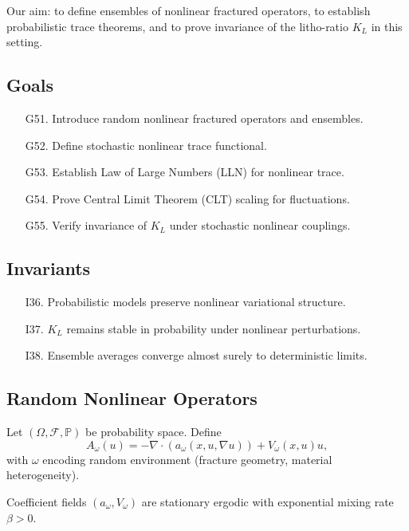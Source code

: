 Our aim: to define ensembles of nonlinear fractured operators, to establish probabilistic trace theorems, and to prove invariance of the litho-ratio $K_L$ in this setting.

\subsection*{Goals}

\begin{itemize}
  \item[G51.] Introduce random nonlinear fractured operators and ensembles.  
  \item[G52.] Define stochastic nonlinear trace functional.  
  \item[G53.] Establish Law of Large Numbers (LLN) for nonlinear trace.  
  \item[G54.] Prove Central Limit Theorem (CLT) scaling for fluctuations.  
  \item[G55.] Verify invariance of $K_L$ under stochastic nonlinear couplings.  
\end{itemize}

\subsection*{Invariants}

\begin{itemize}
  \item[I36.] Probabilistic models preserve nonlinear variational structure.  
  \item[I37.] $K_L$ remains stable in probability under nonlinear perturbations.  
  \item[I38.] Ensemble averages converge almost surely to deterministic limits.  
\end{itemize}

\subsection{Random Nonlinear Operators}

\begin{definition}
Let $(\Omega,\mathcal{F},\mathbb{P})$ be probability space.  
Define
\[
A_\omega(u) = -\nabla \cdot (a_\omega(x,u,\nabla u)) + V_\omega(x,u)u,
\]
with $\omega$ encoding random environment (fracture geometry, material heterogeneity).  
\end{definition}

\begin{assumption}
Coefficient fields $(a_\omega,V_\omega)$ are stationary ergodic with exponential mixing rate $\beta>0$.  
\end{assumption}

